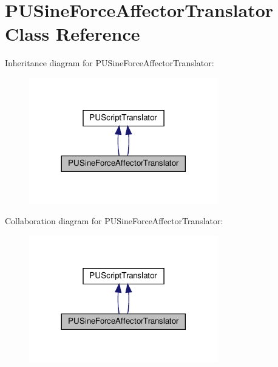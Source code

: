 \hypertarget{classPUSineForceAffectorTranslator}{}\section{P\+U\+Sine\+Force\+Affector\+Translator Class Reference}
\label{classPUSineForceAffectorTranslator}


Inheritance diagram for P\+U\+Sine\+Force\+Affector\+Translator\+:
\nopagebreak
\begin{figure}[H]
\begin{center}
\leavevmode
\includegraphics[width=233pt]{classPUSineForceAffectorTranslator__inherit__graph}
\end{center}
\end{figure}


Collaboration diagram for P\+U\+Sine\+Force\+Affector\+Translator\+:
\nopagebreak
\begin{figure}[H]
\begin{center}
\leavevmode
\includegraphics[width=233pt]{classPUSineForceAffectorTranslator__coll__graph}
\end{center}
\end{figure}
